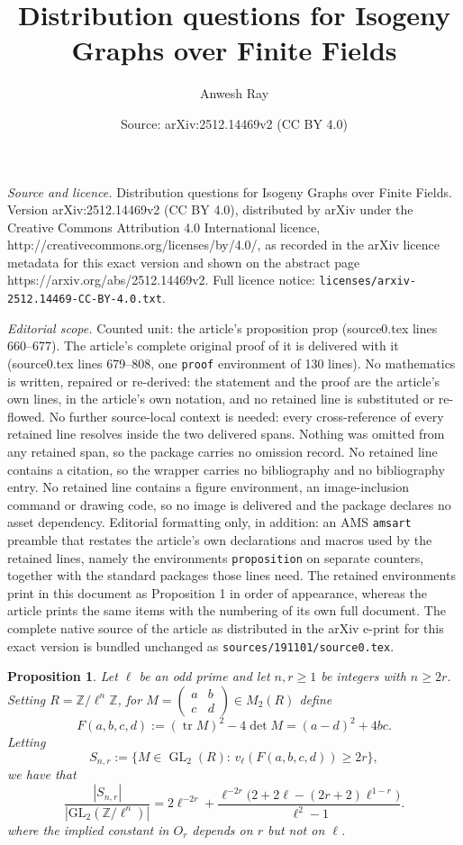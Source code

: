 \documentclass[10pt,a4paper]{amsart}
\title{Distribution questions for Isogeny Graphs over Finite Fields}
\author{Anwesh Ray}
\date{Source: arXiv:2512.14469v2 (CC BY 4.0)}
\newtheorem{proposition}{Proposition}
\newcommand{\Z}{\mathbb{Z}}
\newcommand{\op}[1]{\operatorname{#1}}
\newcommand{\tr}{\operatorname{tr}}
\begin{document}
\maketitle

\noindent\emph{Source and licence.} Distribution questions for Isogeny Graphs over Finite Fields. Version arXiv:2512.14469v2 (CC BY 4.0), distributed by arXiv under the Creative Commons Attribution 4.0 International licence, http://creativecommons.org/licenses/by/4.0/, as recorded in the arXiv licence metadata for this exact version and shown on the abstract page https://arxiv.org/abs/2512.14469v2. Full licence notice: \texttt{licenses/arxiv-2512.14469-CC-BY-4.0.txt}.\par\smallskip

\noindent\textit{Editorial scope.} Counted unit: the article's proposition prop (source0.tex lines 660--677). The article's complete original proof of it is delivered with it (source0.tex lines 679--808, one \texttt{proof} environment of 130 lines). No mathematics is written, repaired or re-derived: the statement and the proof are the article's own lines, in the article's own notation, and no retained line is substituted or re-flowed.  No further source-local context is needed: every cross-reference of every retained line resolves inside the two delivered spans.  Nothing was omitted from any retained span, so the package carries no omission record.  No retained line contains a citation, so the wrapper carries no bibliography and no bibliography entry.  No retained line contains a figure environment, an image-inclusion command or drawing code, so no image is delivered and the package declares no asset dependency.  Editorial formatting only, in addition: an AMS \texttt{amsart} preamble that restates the article's own declarations and macros used by the retained lines, namely the environments \texttt{proposition} on separate counters, together with the standard packages those lines need.  The retained environments print in this document as Proposition 1 in order of appearance, whereas the article prints the same items with the numbering of its own full document.  The complete native source of the article as distributed in the arXiv e-print for this exact version is bundled unchanged as \texttt{sources/191101/source0.tex}.
\begin{proposition}\label{section 3 main prop}
Let $\ell$ be an odd prime and let $n,r\geq 1$ be integers with $n\ge 2r$. Setting
$R=\Z/\ell^n\Z$, for $M=\begin{pmatrix}a&b\\ c&d\end{pmatrix}\in M_2(R)$ define
\[F(a,b,c,d):=(\tr M)^2-4\det M=(a-d)^2+4bc.
\]
Letting
\[
S_{n,r}:=\{M\in\op{GL}_2(R):\,v_\ell(F(a,b,c,d))\ge 2r\},
\]
we have that
\begin{equation}\label{S n r density}
\frac{|S_{n,r}|}{|\mathrm{GL}_2(\mathbb{Z}/\ell^n)|} 
= 2\ell^{-2r}
+
\frac{\ell^{-2r}\big(2+2\ell-(2r+2)\ell^{1-r}\big)}{\ell^{2}-1}.
\end{equation}
where the implied constant in $O_r$ depends on $r$ but not on $\ell$.
\end{proposition}
\end{document}
